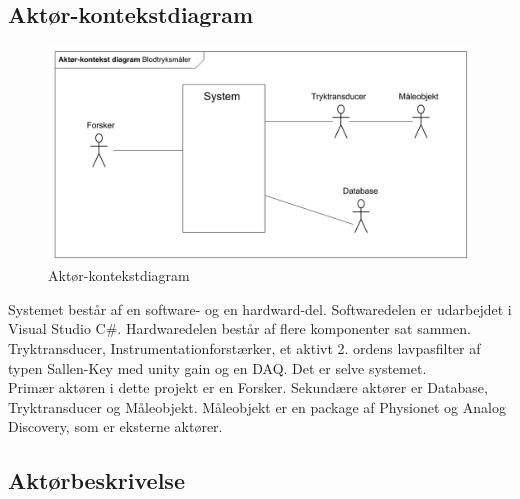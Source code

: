 \subsection{Aktør-kontekstdiagram}
\begin{figure}[H]
	\centering
	\includegraphics[width=1\textwidth]{Figurer/Snip20151104_43}
	\caption{Aktør-kontekstdiagram}
	\label{fig:aktoerbeskrivelse}
\end{figure}

Systemet består af en software- og en hardward-del. Softwaredelen er udarbejdet i Visual Studio C\#. Hardwaredelen består af flere komponenter sat sammen. Tryktransducer, Instrumentationforstærker, et aktivt 2. ordens lavpasfilter af typen Sallen-Key med unity gain og en DAQ. Det er selve systemet. \\
Primær aktøren i dette projekt er en Forsker. Sekundære aktører er Database, Tryktransducer og Måleobjekt. Måleobjekt er en package af Physionet og Analog Discovery, som er eksterne aktører.   

\subsection{Aktørbeskrivelse}

